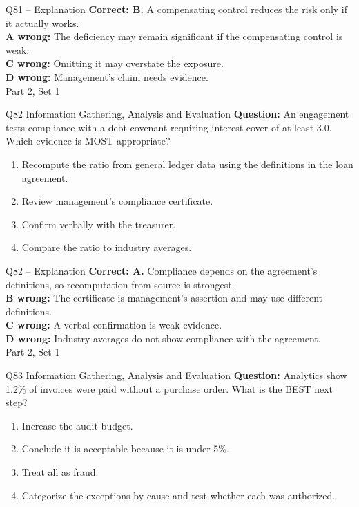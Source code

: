\documentclass[aspectratio=169,10pt]{beamer}
\begin{document}
\begin{frame}[t]{Q81 -- Explanation}
	\footnotesize
	\textbf{Correct: B.} A compensating control reduces the risk only if it actually works. \\[5pt]
\textbf{A wrong:} The deficiency may remain significant if the compensating control is weak. \\[3pt]
\textbf{C wrong:} Omitting it may overstate the exposure. \\[3pt]
\textbf{D wrong:} Management's claim needs evidence. \\[3pt]
	\vfill {\tiny Part 2, Set 1}
\end{frame}
\begin{frame}[t]{Q82 \hfill {\scriptsize Information Gathering, Analysis and Evaluation}}
	\small
	\textbf{Question:} An engagement tests compliance with a debt covenant requiring interest cover of at least 3.0. Which evidence is MOST appropriate?
	\begin{enumerate}[label=\Alph*.,itemsep=1pt,topsep=3pt]
			\item Recompute the ratio from general ledger data using the definitions in the loan agreement.
			\item Review management's compliance certificate.
			\item Confirm verbally with the treasurer.
			\item Compare the ratio to industry averages.
	\end{enumerate}
\end{frame}
\begin{frame}[t]{Q82 -- Explanation}
	\footnotesize
	\textbf{Correct: A.} Compliance depends on the agreement's definitions, so recomputation from source is strongest. \\[5pt]
\textbf{B wrong:} The certificate is management's assertion and may use different definitions. \\[3pt]
\textbf{C wrong:} A verbal confirmation is weak evidence. \\[3pt]
\textbf{D wrong:} Industry averages do not show compliance with the agreement. \\[3pt]
	\vfill {\tiny Part 2, Set 1}
\end{frame}
\begin{frame}[t]{Q83 \hfill {\scriptsize Information Gathering, Analysis and Evaluation}}
	\small
	\textbf{Question:} Analytics show 1.2\% of invoices were paid without a purchase order. What is the BEST next step?
	\begin{enumerate}[label=\Alph*.,itemsep=1pt,topsep=3pt]
			\item Increase the audit budget.
			\item Conclude it is acceptable because it is under 5\%.
			\item Treat all as fraud.
			\item Categorize the exceptions by cause and test whether each was authorized.
	\end{enumerate}
\end{frame}
\end{document}
